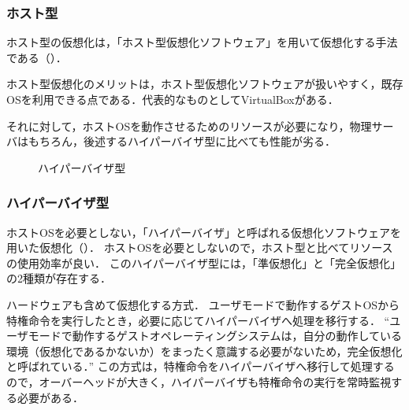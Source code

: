 \subsubsection*{ホスト型}
ホスト型の仮想化は，「ホスト型仮想化ソフトウェア」を用いて仮想化する手法である（）．\par
ホスト型仮想化のメリットは，ホスト型仮想化ソフトウェアが扱いやすく，既存OSを利用できる点である．代表的なものとしてVirtualBoxがある．\par
それに対して，ホストOSを動作させるためのリソースが必要になり，物理サーバはもちろん，後述するハイパーバイザ型に比べても性能が劣る\cite{itmanage}．

\begin{wrapfigure}{r}[0mm]{.3\textwidth}
    \centering
    \caption{ハイパーバイザ型}
    \label{fig:ハイパーバイザ型}
    \vspace{-1cm}
\end{wrapfigure}

\subsubsection*{ハイパーバイザ型}
ホストOSを必要としない，「ハイパーバイザ」と呼ばれる仮想化ソフトウェアを用いた仮想化（）．
ホストOSを必要としないので，ホスト型と比べてリソースの使用効率が良い．
このハイパーバイザ型には，「準仮想化」と「完全仮想化」の2種類が存在する．
\begin{description}
    \setlength{\leftskip}{1em}
    \item[完全仮想化] ハードウェアも含めて仮想化する方式．
        ユーザモードで動作するゲストOSから{{特権命令を実行した}}とき，必要に応じてハイパーバイザへ処理を移行する．
        ``ユーザモードで動作するゲストオペレーティングシステムは，自分の動作している環境（仮想化であるかないか）をまったく意識する必要がないため，完全仮想化と呼ばれている．''\cite[p.159]{オペレーティングシステム}
        この方式は，特権命令をハイパーバイザへ移行して処理するので，オーバーヘッドが大きく，ハイパーバイザも特権命令の実行を常時監視する必要がある．
\end{description}

